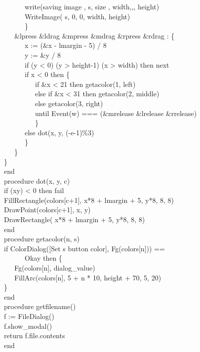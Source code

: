 {\>   \ \ \ \ \ \ write({\textquotedbl}saving image {\textquotedbl}, s,
{\textquotedbl} size {\textquotedbl},
width,{\textquotedbl},{\textquotedbl}, height) \\
\>   \ \ \ \ \ \ WriteImage( s, 0, 0, width, height) \\
\>   \ \ \ \ \ \ \} \\
\>   \ \ \ \&lpress {\textbar} \&ldrag {\textbar} \&mpress {\textbar}
\&mdrag {\textbar} \&rpress {\textbar} \&rdrag : \{ \\
\>   \ \ \ \ \ \ x := (\&x - lmargin - 5) / 8 \\
\>   \ \ \ \ \ \ y := \&y / 8 \\
\>   \ \ \ \ \ \ if (y {\textless} 0) {\textbar} (y {\textgreater}
height-1) {\textbar} (x {\textgreater} width) then next \\
\>   \ \ \ \ \ \ if x {\textless} 0 then \{ \\
\>   \ \ \ \ \ \ \ \ \ if \&x {\textless} 21 then getacolor(1,
{\textquotedbl}left{\textquotedbl}) \\
\>   \ \ \ \ \ \ \ \ \ else if \&x {\textless} 31 then getacolor(2,
{\textquotedbl}middle{\textquotedbl}) \\
\>   \ \ \ \ \ \ \ \ \ else getacolor(3,
{\textquotedbl}right{\textquotedbl}) \\
\>   \ \ \ \ \ \ \ \ \ until Event(w) === (\&mrelease {\textbar}
\&lrelease{\textbar} \&rrelease) \\
\>   \ \ \ \ \ \ \ \ \ \} \\
\>   \ \ \ \ \ \ else dot(x, y, (-e-1)\%3) \\
\>   \ \ \ \ \ \ \} \\
\>   \ \ \ \} \\
\>   \} \\
end
\ \\
procedure dot(x, y, c) \\
\>   if (x{\textbar}y) {\textless} 0 then fail \\
\>   FillRectangle(colors[c+1], x*8 + lmargin + 5, y*8, 8, 8) \\
\>   DrawPoint(colors[c+1], x, y) \\
\>   DrawRectangle( x*8 + lmargin + 5, y*8, 8, 8) \\
end
\ \\
procedure getacolor(n, s) \\
\>   if ColorDialog([{\textquotedbl}Set
{\textquotedbl}{\textbar}{\textbar}s{\textbar}{\textbar}{\textquotedbl}
button color{\textquotedbl}], Fg(colors[n])) == \\
\>   \ \ \ \ \ \ {\textquotedbl}Okay{\textquotedbl} then \{ \\
\>   \ \ \ Fg(colors[n], dialog\_value) \\
\>   \ \ \ FillArc(colors[n], 5 + n * 10, height + 70, 5, 20) \\
\>   \} \\
end
\ \\
procedure getfilename() \\
\>   f := FileDialog() \\
\>   f.show\_modal() \\
\>   return f.file.contents \\
end
}

